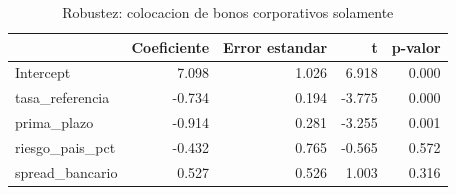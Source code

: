 \begin{table}
\caption{Robustez: colocacion de bonos corporativos solamente}
\label{tab:tabla4_robustez_corporativos}
\begin{tabular}{lrrrr}
\toprule
 & Coeficiente & Error estandar & t & p-valor \\
\midrule
Intercept & 7.098 & 1.026 & 6.918 & 0.000 \\
tasa_referencia & -0.734 & 0.194 & -3.775 & 0.000 \\
prima_plazo & -0.914 & 0.281 & -3.255 & 0.001 \\
riesgo_pais_pct & -0.432 & 0.765 & -0.565 & 0.572 \\
spread_bancario & 0.527 & 0.526 & 1.003 & 0.316 \\
\bottomrule
\end{tabular}
\end{table}
